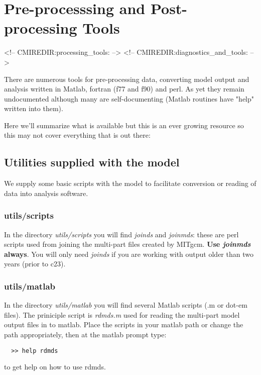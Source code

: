 
\chapter{Pre-processsing and Post-processing Tools}
\begin{rawhtml}
<!-- CMIREDIR:processing_tools: -->
<!-- CMIREDIR:diagnostics_and_tools: -->
\end{rawhtml}

There are numerous tools for pre-processing data, converting model
output and analysis written in Matlab, fortran (f77 and f90) and perl.
As yet they remain undocumented although many are self-documenting
(Matlab routines have "help" written into them).

Here we'll summarize what is available but this is an ever growing resource
so this may not cover everything that is out there:

\section{Utilities supplied with the model}

We supply some basic scripts with the model to facilitate conversion or reading
of data into analysis software.

\subsection{utils/scripts}

In the directory {\em utils/scripts} you will find {\em joinds} and {\em joinmds}:
these are perl scripts used from joining the multi-part files created by
MITgcm. {\bf Use {\em joinmds} always}. You will only need {\em joinds} if you
are working with output older than two years (prior to c23).

\subsection{utils/matlab}

In the directory {\em utils/matlab} you will find several Matlab scripts
(.m or dot-em files). The priniciple script is {\em rdmds.m} used for reading
the multi-part model output files in to matlab. Place the scripts in your
matlab path or change the path appropriately, then at the matlab prompt type:
\begin{verbatim}
  >> help rdmds
\end{verbatim}
to get help on how to use rdmds.

